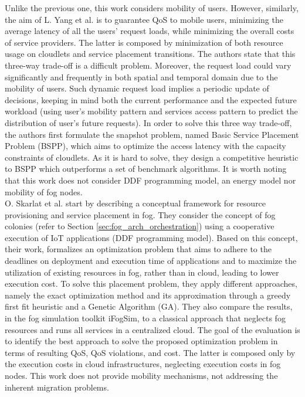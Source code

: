 \noindent\tab Unlike the previous one, this work considers mobility of users. However, similarly, the aim of L. Yang et al. \cite{yang2016cost} is to guarantee QoS to mobile users, minimizing the average latency of all the users’ request loads, while minimizing the overall costs of service providers. The latter is composed by minimization of both resource usage on cloudlets and service placement transitions. The authors state that this three-way trade-off is a difficult problem. Moreover, the request load could vary significantly and frequently in both spatial and temporal domain due to the mobility of users. Such dynamic request load implies a periodic update of decisions, keeping in mind both the current performance and the expected future workload (using user’s mobility pattern and services access pattern to predict the distribution of user’s future requests). In order to solve this three way trade-off, the authors first formulate the snapshot problem, named Basic Service Placement Problem (BSPP), which aims to optimize the access latency with the capacity constraints of cloudlets. As it is hard to solve, they design a competitive heuristic to BSPP which outperforms a set of benchmark algorithms. It is worth noting that this work does not consider DDF programming model, an energy model nor mobility of fog nodes.\\%
\noindent\tab O. Skarlat et al. \cite{skarlat2017optimized} start by describing a conceptual framework for resource provisioning and service placement in fog. They consider the concept of fog colonies (refer to Section \ref{sec:fog_arch_orchestration}) using a cooperative execution of IoT applications (DDF programming model). Based on this concept, their work, formalizes an optimization problem that aims to adhere to the deadlines on deployment and execution time of applications and to maximize the utilization of existing resources in fog, rather than in cloud, leading to lower execution cost. To solve this placement problem, they apply different approaches, namely the exact optimization method and its approximation through a greedy first fit heuristic and a Genetic Algorithm (GA). They also compare the results, in the fog simulation toolkit iFogSim, to a classical approach that neglects fog resources and runs all services in a centralized cloud. The goal of the evaluation is to identify the best approach to solve the proposed optimization problem in terms of resulting QoS, QoS violations, and cost. The latter is composed only by the execution costs in cloud infrastructures, neglecting execution costs in fog nodes. This work does not provide mobility mechanisms, not addressing the inherent migration problems.\\
